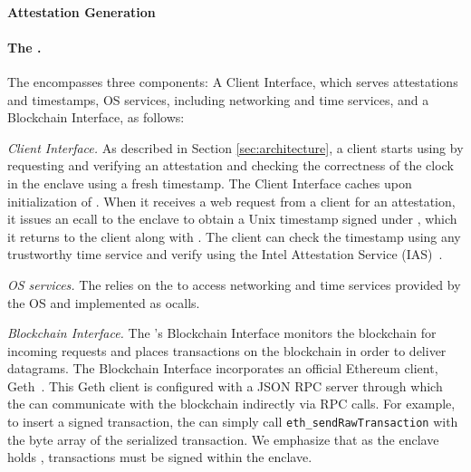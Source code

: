 \paragraph{Attestation Generation} 


\paragraph{The \medname.} The \medname encompasses three components: A Client Interface, which serves attestations and timestamps, OS services, including networking and time services, and a Blockchain Interface, as follows:

\vspace{2mm}

\noindent\emph{Client Interface.} As described in Section \ref{sec:architecture},
a client starts using \tc by requesting and verifying an attestation \att and checking the correctness of the clock in the \tc enclave using a fresh timestamp.
The Client Interface caches \att upon initialization of \engine. When it receives a web request from a client for an attestation,
it issues an ecall to the enclave to obtain a
Unix timestamp signed under \pkTC, which it returns to the client along with \att. The client can check the timestamp using any trustworthy time service and verify \att 
using the Intel Attestation Service (IAS)~\cite{}. 

\vspace{2mm}

\noindent\emph{OS services.} The \encname relies on the \medname to access networking and 
time services  provided by the OS and implemented as ocalls.

\vspace{2mm}

\noindent\emph{Blockchain Interface.} The \medname's Blockchain Interface monitors the
blockchain for incoming requests and places transactions on the blockchain in order to
deliver datagrams. The Blockchain Interface incorporates an 
official Ethereum client, Geth~\cite{geth}. This Geth client is configured with a JSON RPC server through which the
\medname can communicate with the blockchain indirectly via RPC calls. For example, to insert a signed transaction, the \medname can simply call
\texttt{eth\_sendRawTransaction} with the byte array of the serialized
transaction. We emphasize that as the enclave holds \skTC, transactions must be signed within the enclave.


